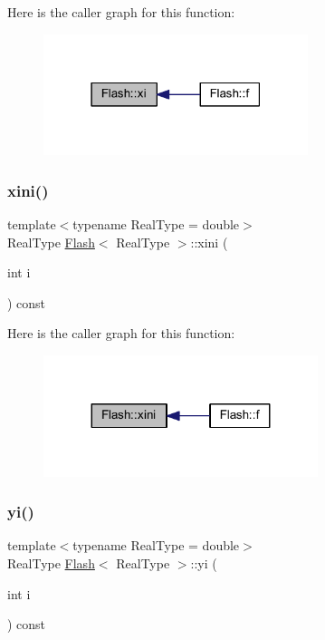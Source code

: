Here is the caller graph for this function\+:\nopagebreak
\begin{figure}[H]
\begin{center}
\leavevmode
\includegraphics[width=219pt]{class_flash_abf2fb32491f3e75427ad25dadd7af546_icgraph}
\end{center}
\end{figure}
\mbox{\label{class_flash_a64985fac64164cce252b68801b269f78}} 
\subsubsection{\texorpdfstring{xini()}{xini()}}
{\footnotesize\ttfamily template$<$typename Real\+Type = double$>$ \\
Real\+Type \mbox{\hyperlink{class_flash}{Flash}}$<$ Real\+Type $>$\+::xini (\begin{DoxyParamCaption}\item[{int}]{i }\end{DoxyParamCaption}) const\hspace{0.3cm}{\ttfamily [inline]}}

Here is the caller graph for this function\+:\nopagebreak
\begin{figure}[H]
\begin{center}
\leavevmode
\includegraphics[width=227pt]{class_flash_a64985fac64164cce252b68801b269f78_icgraph}
\end{center}
\end{figure}
\mbox{\label{class_flash_a79622eee2bd4ec63c7d04c50603119a0}} 
\subsubsection{\texorpdfstring{yi()}{yi()}}
{\footnotesize\ttfamily template$<$typename Real\+Type = double$>$ \\
Real\+Type \mbox{\hyperlink{class_flash}{Flash}}$<$ Real\+Type $>$\+::yi (\begin{DoxyParamCaption}\item[{int}]{i }\end{DoxyParamCaption}) const\hspace{0.3cm}{\ttfamily [inline]}}

